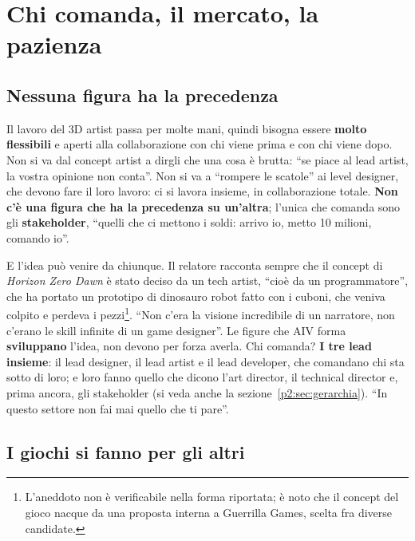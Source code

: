 \section{Chi comanda, il mercato, la pazienza}
\label{p6:sec:comanda}

\subsection{Nessuna figura ha la precedenza}

Il lavoro del 3D artist passa per molte mani, quindi bisogna essere
\textbf{molto flessibili} e aperti alla collaborazione con chi viene prima e
con chi viene dopo. Non si va dal concept artist a dirgli che una cosa è brutta:
``se piace al lead artist, la vostra opinione non conta''. Non si va a ``rompere
le scatole'' ai level designer, che devono fare il loro lavoro: ci si lavora
insieme, in collaborazione totale. \textbf{Non c'è una figura che ha la
precedenza su un'altra}; l'unica che comanda sono gli \textbf{stakeholder},
``quelli che ci mettono i soldi: arrivo io, metto 10 milioni, comando io''.

E l'idea può venire da chiunque. Il relatore racconta sempre che il concept di
\emph{Horizon Zero Dawn} è stato deciso da un tech artist, ``cioè da un
programmatore'', che ha portato un prototipo di dinosauro robot fatto con i
cuboni, che veniva colpito e perdeva i pezzi\footnote{L'aneddoto non è
verificabile nella forma riportata; è noto che il concept del gioco nacque da
una proposta interna a Guerrilla Games, scelta fra diverse candidate.}. ``Non
c'era la visione incredibile di un narratore, non c'erano le skill infinite di
un game designer''. Le figure che AIV forma \textbf{sviluppano} l'idea, non
devono per forza averla. Chi comanda? \textbf{I tre lead insieme}: il lead
designer, il lead artist e il lead developer, che comandano chi sta sotto di
loro; e loro fanno quello che dicono l'art director, il technical director e,
prima ancora, gli stakeholder (si veda anche la
sezione~\ref{p2:sec:gerarchia}). ``In questo settore non fai mai quello che ti
pare''.

\subsection{I giochi si fanno per gli altri}

